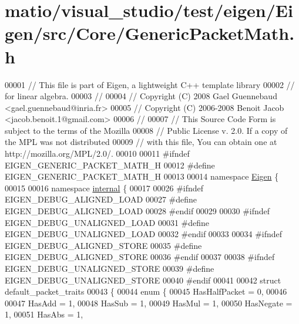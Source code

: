 \hypertarget{matio_2visual__studio_2test_2eigen_2_eigen_2src_2_core_2_generic_packet_math_8h_source}{}\section{matio/visual\+\_\+studio/test/eigen/\+Eigen/src/\+Core/\+Generic\+Packet\+Math.h}
\label{matio_2visual__studio_2test_2eigen_2_eigen_2src_2_core_2_generic_packet_math_8h_source}

\begin{DoxyCode}
00001 \textcolor{comment}{// This file is part of Eigen, a lightweight C++ template library}
00002 \textcolor{comment}{// for linear algebra.}
00003 \textcolor{comment}{//}
00004 \textcolor{comment}{// Copyright (C) 2008 Gael Guennebaud <gael.guennebaud@inria.fr>}
00005 \textcolor{comment}{// Copyright (C) 2006-2008 Benoit Jacob <jacob.benoit.1@gmail.com>}
00006 \textcolor{comment}{//}
00007 \textcolor{comment}{// This Source Code Form is subject to the terms of the Mozilla}
00008 \textcolor{comment}{// Public License v. 2.0. If a copy of the MPL was not distributed}
00009 \textcolor{comment}{// with this file, You can obtain one at http://mozilla.org/MPL/2.0/.}
00010 
00011 \textcolor{preprocessor}{#ifndef EIGEN\_GENERIC\_PACKET\_MATH\_H}
00012 \textcolor{preprocessor}{#define EIGEN\_GENERIC\_PACKET\_MATH\_H}
00013 
00014 \textcolor{keyword}{namespace }\hyperlink{namespace_eigen}{Eigen} \{
00015 
00016 \textcolor{keyword}{namespace }\hyperlink{namespaceinternal}{internal} \{
00017 
00026 \textcolor{preprocessor}{#ifndef EIGEN\_DEBUG\_ALIGNED\_LOAD}
00027 \textcolor{preprocessor}{#define EIGEN\_DEBUG\_ALIGNED\_LOAD}
00028 \textcolor{preprocessor}{#endif}
00029 
00030 \textcolor{preprocessor}{#ifndef EIGEN\_DEBUG\_UNALIGNED\_LOAD}
00031 \textcolor{preprocessor}{#define EIGEN\_DEBUG\_UNALIGNED\_LOAD}
00032 \textcolor{preprocessor}{#endif}
00033 
00034 \textcolor{preprocessor}{#ifndef EIGEN\_DEBUG\_ALIGNED\_STORE}
00035 \textcolor{preprocessor}{#define EIGEN\_DEBUG\_ALIGNED\_STORE}
00036 \textcolor{preprocessor}{#endif}
00037 
00038 \textcolor{preprocessor}{#ifndef EIGEN\_DEBUG\_UNALIGNED\_STORE}
00039 \textcolor{preprocessor}{#define EIGEN\_DEBUG\_UNALIGNED\_STORE}
00040 \textcolor{preprocessor}{#endif}
00041 
00042 \textcolor{keyword}{struct }default\_packet\_traits
00043 \{
00044   \textcolor{keyword}{enum} \{
00045     HasHalfPacket = 0,
00046 
00047     HasAdd    = 1,
00048     HasSub    = 1,
00049     HasMul    = 1,
00050     HasNegate = 1,
00051     HasAbs    = 1,

\end{DoxyCode}
